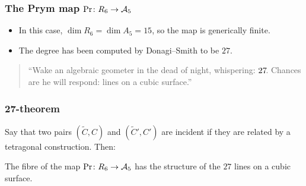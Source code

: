 \begin{frame}
\frametitle{The Prym map $\Pr \colon R_6 \to \mathcal{A}_5$}

\begin{itemize}
	\item In this case, $\dim R_6 = \dim A_5 = 15$, so the map is generically finite.
	\pause
	\item The degree has been computed by Donagi--Smith to be $27$.
\end{itemize}

\pause

\vfill
\begin{quote}
    \large
    ``Wake an algebraic geometer in the dead of night, \phantom{``}whispering: $27\mkern-3mu$. Chances are he will respond: lines on a \phantom{``}cubic surface.''
\end{quote}
\vfill 

\end{frame}

\begin{frame}
\frametitle{27-theorem}

Say that two pairs $(\widetilde C, C)$ and $(\widetilde C', C')$ are \alert{incident} if they are related by a tetragonal construction. Then:

\pause
\hfill
\hfill

\begin{theorem}
The fibre of the map $\Pr \colon R_6 \to \mathcal{A}_5$ has the structure of the $27$ lines on a cubic surface.
\end{theorem}

\end{frame}